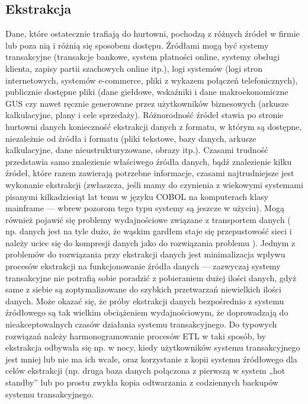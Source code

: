 \subsection{Ekstrakcja}
Dane, które ostatecznie trafiają do hurtowni,
 pochodzą z różnych źródeł w firmie lub poza nią i różnią się sposobem dostępu.
Źródłami mogą być systemy transakcyjne (transakcje bankowe, system płatności online, systemy obsługi klienta,
 zapisy partii szachowych online itp.),
 logi systemów (logi stron internetowych,
 systemów e-commerce,
 pliki z wykazem połączeń telefonicznych),
 publicznie dostępne pliki 
 (dane giełdowe, wskaźniki i dane makroekonomiczne GUS czy nawet ręcznie generowane przez użytkowników biznesowych 
 (arkusze kalkulacyjne, plany i cele sprzedaży).
Różnorodność źródeł stawia po stronie hurtowni danych konieczność ekstrakcji danych z formatu,
 w którym są dostępne,
 niezależnie od źródła i formatu 
 (pliki tekstowe, bazy danych, arkusze kalkulacyjne, dane nieustrukturyzowane, obrazy itp.).
Czasami trudność przedstawia samo znalezienie właściwego źródła danych,
 bądź znalezienie kilku źródeł, które razem zawierają potrzebne informacje,
 czasami najtrudniejsze jest wykonanie ekstrakcji 
 (zwłaszcza, jeśli mamy do czynienia z wiekowymi systemami pisanymi kilkadziesiąt lat temu w języku COBOL na komputerach klasy mainframe 
 --- wbrew pozorom tego typu systemy są jeszcze w użyciu).
Mogą również pojawić się problemy wydajnościowe związane z transportem danych 
 (
   np. danych jest na tyle dużo,
   że wąskim gardłem staje się przepustowość sieci 
   i należy uciec się do kompresji danych jako do rozwiązania problemu
 ).
Jednym z problemów do rozwiązania przy ekstrakcji danych jest minimalizacja wpływu procesów ekstrakcji na funkcjonowanie źródła danych 
 --- zazwyczaj systemy transakcyjne nie potrafią sobie poradzić z pobieraniem dużej ilości danych, 
 gdyż same z siebie są zoptymalizowane do szybkich przetwarzań niewielkich ilości danych.
Może okazać się, że próby ekstrakcji danych bezpośrednio z systemu źródłowego są tak wielkim obciążeniem wydajnościowym,
 że doprowadzają do nieakceptowalnych czasów działania systemu transakcyjnego.
Do typowych rozwiązań należy harmonogramowanie procesów ETL w taki sposób,
 by ekstrakcja odbywała się np. w nocy,
 kiedy użytkowników systemu transakcyjnego jest mniej lub nie ma ich wcale, 
 oraz korzystanie z kopii systemu źródłowego dla celów ekstrakcji 
 (np. druga baza danych połączona z pierwszą w system „hot standby” 
 lub po prostu zwykła kopia odtwarzania z codziennych backupów systemu transakcyjnego.


